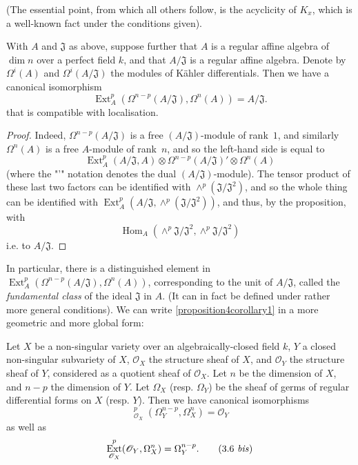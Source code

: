 \documentclass{article}
\theoremstyle{plain}
\newenvironment{corollary}[1]
  {\renewcommand\theinnercustomcorollary{#1}\innercustomcorollary}
  {\endinnercustomcorollary}
\theoremstyle{definition}
\newcommand{\sh}{\mathscr}
\DeclareMathOperator{\Ext}{Ext}
\DeclareMathOperator{\Hom}{Hom}
\DeclareMathOperator{\shExt}{\underline{Ext}}
\newcommand{\oldpage}[1]{\marginpar{\footnotesize$\Big\vert$ \textit{p.~#1}}}
\begin{document}
(The essential point, from which all others follow, is the acyclicity of $K_x$, which is a well-known fact under the conditions given).

\begin{corollary}{1}
\label{proposition4corollary1}
  With $A$ and $\mathfrak{J}$ as above, suppose further that $A$ is a regular affine algebra of $\dim n$ over a perfect field $k$, and that $A/\mathfrak{J}$ is a regular affine algebra.
  Denote by $\Omega^i(A)$ and $\Omega^i(A/\mathfrak{J})$ the modules of K\"{a}hler differentials.
  Then we have a canonical isomorphism
  \[
  \label{3.5}
    \Ext_A^p(\Omega^{n-p}(A/\mathfrak{J}),\Omega^n(A)) = A/\mathfrak{J}.
  \tag{3.5}
  \]
  that is compatible with localisation.
\end{corollary}

\begin{proof}
  Indeed, $\Omega^{n-p}(A/\mathfrak{J})$ is a free $(A/\mathfrak{J})$-module of rank~$1$, and similarly $\Omega^n(A)$ is a free $A$-module of rank~$n$, and so the left-hand side is equal to
  \[
    \Ext_A^p(A/\mathfrak{J},A) \otimes \Omega^{n-p}(A/\mathfrak{J})' \otimes \Omega^n(A)
  \]
  (where the "'" notation denotes the dual $(A/\mathfrak{J})$-module).
  The tensor product of these last two factors can be identified with $\wedge^p(\mathfrak{J}/\mathfrak{J}^2)$, and so the whole thing can be identified with $\Ext_A^p(A/\mathfrak{J},\wedge^p(\mathfrak{J}/\mathfrak{J}^2))$, and thus, by the proposition, with
  \[
    \Hom_A(\wedge^p \mathfrak{J}/\mathfrak{J}^2,\wedge^p \mathfrak{J}/\mathfrak{J}^2)
  \]
  i.e. to $A/\mathfrak{J}$.
\end{proof}

In particular, there is a distinguished element in $\Ext_A^p(\Omega^{n-p}(A/\mathfrak{J}),\Omega^n(A))$, corresponding to the unit of $A/\mathfrak{J}$, called the \emph{fundamental class} of the ideal $\mathfrak{J}$ in $A$.
(It can in fact be defined under rather more general conditions).
We can write \cref{proposition4corollary1} in a more geometric and more global form:

\begin{corollary}{2}
\label{proposition4corollary2}
  Let $X$ be a non-singular variety over an algebraically-closed field $k$, $Y$ a closed non-singular subvariety of $X$, $\sh{O}_X$ the structure sheaf of $X$, and $\sh{O}_Y$ the structure sheaf of $Y$, considered as a quotient sheaf of $\sh{O}_X$.
  Let $n$ be the dimension of $X$, and $n-p$ the dimension of $Y$.
\oldpage{149-08}
  Let $\Omega_X$ (resp. $\Omega_Y$) be the sheaf of germs of regular differential forms on $X$ (resp. $Y$).
  Then we have canonical isomorphisms
  \[
  \label{3.6}
    \shExt_{\sh{O}_X}^p(\Omega_Y^{n-p},\Omega_X^n) = \sh{O}_Y
  \tag{3.6}
  \]
  as well as
  \[
  \label{3.6bis}
    \Ext_{\sh{O}_X}^p(\sh{O}_Y,\Omega_X^n) = \Omega_Y^{n-p}.
  \tag{3.6 \emph{bis}}
  \]
\end{corollary}
\end{document}
